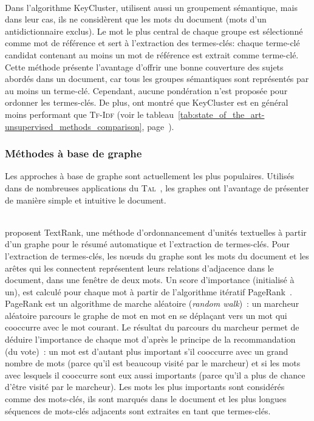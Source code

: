         ~\\Dans l'algorithme KeyCluster,  utilisent
        aussi un groupement sémantique, mais dans leur cas, ils ne considèrent
        que les mots du document (mots d'un antidictionnaire exclus). Le mot le
        plus central de chaque groupe est sélectionné comme mot de référence et
        sert à l'extraction des termes-clés: chaque terme-clé candidat contenant
        au moins un mot de référence est extrait comme terme-clé. Cette méthode
        présente l'avantage d'offrir une bonne couverture des sujets abordés
        dans un document, car tous les groupes sémantiques sont représentés par
        au moins un terme-clé. Cependant, aucune pondération n'est proposée pour
        ordonner les termes-clés. De plus,  ont
        montré que KeyCluster est en général moins performant que \textsc{Tf-Idf}
        (voir le tableau~\ref{tab:state_of_the_art-unsupervised_methods_comparison},
        page~\pageref{tab:state_of_the_art-unsupervised_methods_comparison}).

      \subsubsection{Méthodes à base de graphe}
      \label{subsubsec:main-state_of_the_art-automatic_keyphrase_extraction-unsupervised_keyphrase_extraction-graph_based_approaches}
        Les approches à base de graphe sont actuellement les plus populaires.
        Utilisés dans de nombreuses applications du
        \textsc{Tal}~\cite{kozareva2013textgraphs}, les graphes ont l'avantage
        de présenter de manière simple et intuitive le document.

        ~\\ proposent TextRank, une méthode
        d'ordonnancement d'unités textuelles à partir d'un graphe pour le résumé
        automatique et l'extraction de termes-clés. Pour l'extraction de
        termes-clés, les n\oe{}uds du graphe sont les mots du document et les
        arêtes qui les connectent représentent leurs relations d'adjacence dans
        le document, dans une fenêtre de deux mots. Un score
        d'importance (initialisé à un), est calculé pour chaque mot à partir de
        l'algorithme itératif PageRank~\cite{brin1998pagerank}. PageRank est un
        algorithme de marche aléatoire (\textit{random walk})~: un marcheur
        aléatoire parcours le graphe de mot en mot en se déplaçant vers un mot
        qui cooccurre avec le mot courant. Le résultat du parcours du marcheur
        permet de déduire l'importance de chaque mot d'après le principe de la
        recommandation (du vote)~:  un mot est d'autant plus important s'il
        cooccurre avec un grand nombre de mots (parce qu'il est beaucoup visité
        par le marcheur) et si les mots avec lesquels il cooccurre sont eux
        aussi importants (parce qu'il a plus de chance d'être visité par le
        marcheur). Les mots les plus importants sont considérés comme des
        mots-clés, ils sont marqués dans le document et les plus longues
        séquences de mots-clés adjacents sont extraites en tant que termes-clés.
      
